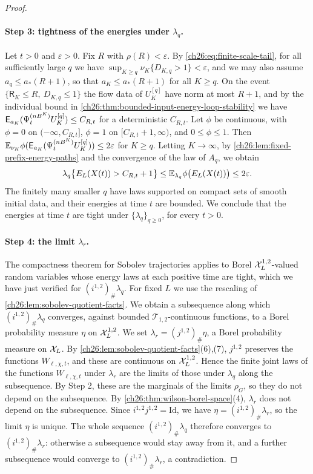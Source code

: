 \begin{proof}
\paragraph{Step 3: tightness of the energies under $\lambda_q$.}
Let $t>0$ and $\varepsilon>0$. Fix $R$ with $\rho(R)<\varepsilon$. By \eqref{ch26:eq:finite-scale-tail}, for all sufficiently large $q$ we have $\sup_{K\ge q}\nu_K\{D_{K,q}>1\}<\varepsilon$, and we may also assume $a_q\le a_*(R+1)$, so that $a_K\le a_*(R+1)$ for all $K\ge q$. On the event $\{\mathsf R_K\le R,\ D_{K,q}\le1\}$ the flow data of $U_K^{[q]}$ have norm at most $R+1$, and by the individual bound in \cref{ch26:thm:bounded-input-energy-loop-stability} we have $\mathsf E_{a_K}(\Psi^{(nB^K)}_tU_K^{[q]})\le C_{R,t}$ for a deterministic $C_{R,t}$. Let $\phi$ be continuous, with $\phi=0$ on $(-\infty,C_{R,t}]$, $\phi=1$ on $[C_{R,t}+1,\infty)$, and $0\le\phi\le1$. Then $\mathbb E_{\nu_K}\phi(\mathsf E_{a_K}(\Psi^{(nB^K)}_tU^{[q]}_K))\le2\varepsilon$ for $K\ge q$. Letting $K\to\infty$, by \cref{ch26:lem:fixed-prefix-energy-paths} and the convergence of the law of $A_q$, we obtain
\[
 \lambda_q\bigl\{E_L(X(t))>C_{R,t}+1\bigr\}\le\mathbb E_{\lambda_q}\phi\bigl(E_L(X(t))\bigr)\le2\varepsilon .
\]
The finitely many smaller $q$ have laws supported on compact sets of smooth initial data, and their energies at time $t$ are bounded. We conclude that the energies at time $t$ are tight under $\{\lambda_q\}_{q\ge0}$, for every $t>0$.

\paragraph{Step 4: the limit $\lambda_r$.}
The compactness theorem for Sobolev trajectories \cite[Theorem 3.73, pp.~41--42]{CCState2023v4} applies to Borel $\mathcal X_L^{1,2}$-valued random variables whose energy laws at each positive time are tight, which we have just verified for $(i^{1,2})_\#\lambda_q$. For fixed $L$ we use the rescaling of \cref{ch26:lem:sobolev-quotient-facts}. We obtain a subsequence along which $(i^{1,2})_\#\lambda_q$ converges, against bounded $\mathcal T_{1,2}$-continuous functions, to a Borel probability measure $\eta$ on $\mathcal X_L^{1,2}$. We set $\lambda_r=(j^{1,2})_\#\eta$, a Borel probability measure on $\mathcal X_L$. By \cref{ch26:lem:sobolev-quotient-facts}(6),(7), $j^{1,2}$ preserves the functions $W_{\ell,\chi,t}$, and these are continuous on $\mathcal X_L^{1,2}$. Hence the finite joint laws of the functions $W_{\ell,\chi,t}$ under $\lambda_r$ are the limits of those under $\lambda_q$ along the subsequence. By Step 2, these are the marginals of the limits $\rho_G$, so they do not depend on the subsequence. By \cref{ch26:thm:wilson-borel-space}(4), $\lambda_r$ does not depend on the subsequence. Since $i^{1,2}j^{1,2}=\mathrm{Id}$, we have $\eta=(i^{1,2})_\#\lambda_r$, so the limit $\eta$ is unique. The whole sequence $(i^{1,2})_\#\lambda_q$ therefore converges to $(i^{1,2})_\#\lambda_r$: otherwise a subsequence would stay away from it, and a further subsequence would converge to $(i^{1,2})_\#\lambda_r$, a contradiction.


\end{proof}

